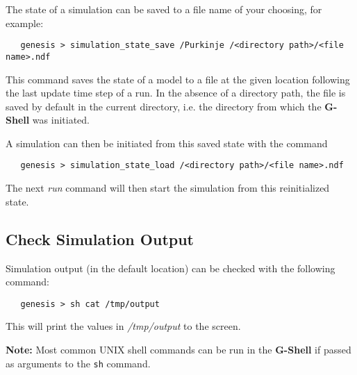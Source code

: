 \documentclass[12pt]{article}
\begin{document}
The state of a simulation can be saved to a file name of your choosing, for example:
\begin{verbatim}
   genesis > simulation_state_save /Purkinje /<directory path>/<file name>.ndf
\end{verbatim}
This command saves the state of a model to a file at the given location following the last update time step of a run. In the absence of a directory path, the file is saved by default in the current directory, i.e. the directory from which the {\bf G-Shell} was initiated.

A simulation can then be initiated from this saved 
state with the command 
\begin{verbatim}
   genesis > simulation_state_load /<directory path>/<file name>.ndf 
\end{verbatim}
The next {\it run} command will then start the simulation from this reinitialized state.

\subsection*{Check Simulation Output}

Simulation output (in the default location) can be checked with the following command:
\begin{verbatim}
   genesis > sh cat /tmp/output
\end{verbatim}
This will print the values in {\it /tmp/output} to the screen.

{\bf Note:} Most common UNIX shell commands can be run in the {\bf G-Shell} if passed as arguments to the {\tt sh} command.
\end{document}
